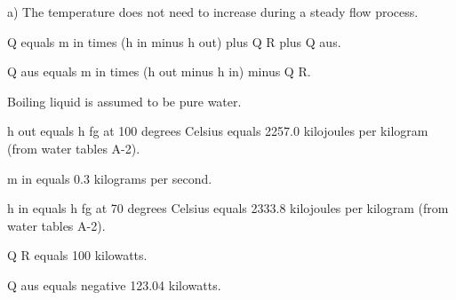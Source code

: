 a) The temperature does not need to increase during a steady flow process.  

Q equals m in times (h in minus h out) plus Q R plus Q aus.  

Q aus equals m in times (h out minus h in) minus Q R.  

Boiling liquid is assumed to be pure water.  

h out equals h fg at 100 degrees Celsius equals 2257.0 kilojoules per kilogram (from water tables A-2).  

m in equals 0.3 kilograms per second.  

h in equals h fg at 70 degrees Celsius equals 2333.8 kilojoules per kilogram (from water tables A-2).  

Q R equals 100 kilowatts.  

Q aus equals negative 123.04 kilowatts.